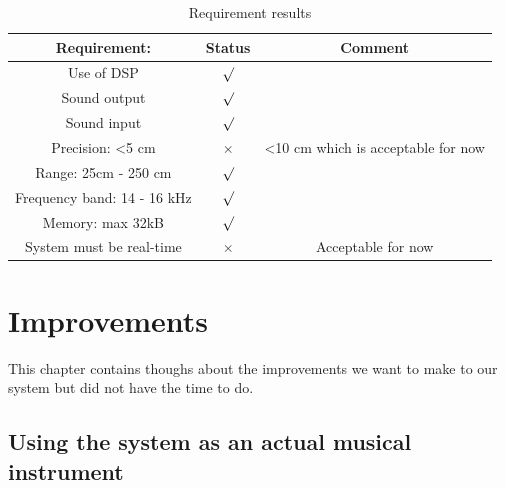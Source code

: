 \begin{table}[H]
\centering
\begin{tabular}{ c c c }
\hline
Requirement: & Status & Comment \\ \hline
Use of DSP & $\surd$ \\
Sound output & $\surd$ \\
Sound input & $\surd$ \\
Precision: <5 cm & $\times$ & <10 cm which is acceptable for now \\
Range: 25cm - 250 cm & $\surd$ \\
Frequency band: 14 - 16 kHz & $\surd$ \\
Memory: max 32kB & $\surd$ \\
System must be real-time & $\times$ & Acceptable for now \\ \hline
\end{tabular}
\caption{Requirement results}
\label{table:alltest}
\end{table}

\chapter{Improvements}
This chapter contains thoughs about the improvements we want to make to our system but did not have the time to do.
\section{Using the system as an actual musical instrument}
